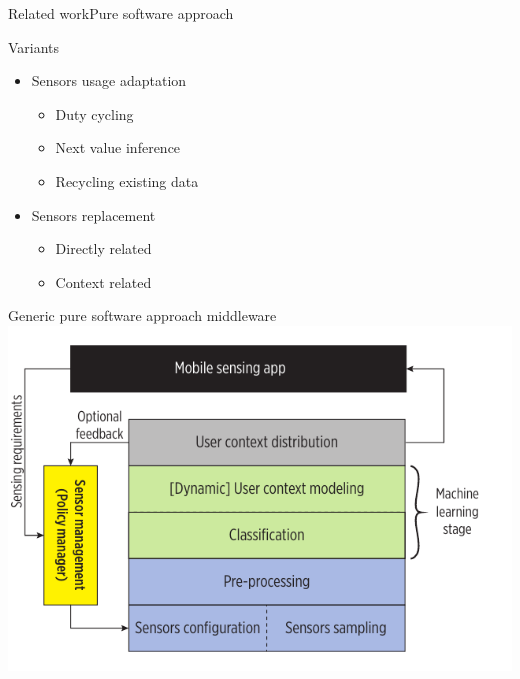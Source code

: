\documentclass[8pt,xcolor={dvipsnames},handout]{beamer}
\begin{document}
\begin{frame}{Related work}{Pure software approach}
\begin{multicols}{2}
\begin{exampleblock}{Variants}
\begin{itemize}
  \item Sensors usage adaptation
    \begin{itemize}
      \item Duty cycling
      \item Next value inference
      \item Recycling existing data
    \end{itemize}
  \item Sensors replacement
  \begin{itemize}
    \item Directly related
    \item Context related
  \end{itemize}
\end{itemize}
\end{exampleblock}

\newpage
{\small Generic pure software approach middleware}
  {
  \centering
  \includegraphics[width=1.2\columnwidth]{vectors/generic-middleware-architecture-v2}
  }
\end{multicols}
\end{frame}
\end{document}
